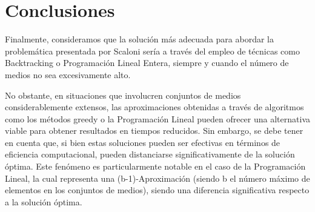 \section{Conclusiones}

Finalmente, consideramos que la solución más adecuada para abordar la problemática presentada por Scaloni sería a través del empleo de técnicas como Backtracking o Programación Lineal Entera, siempre y cuando el número de medios no sea excesivamente alto. 

No obstante, en situaciones que involucren conjuntos de medios considerablemente extensos, las aproximaciones obtenidas a través de algoritmos como los métodos greedy o la Programación Lineal pueden ofrecer una alternativa viable para obtener resultados en tiempos reducidos. Sin embargo, se debe tener en cuenta que, si bien estas soluciones pueden ser efectivas en términos de eficiencia computacional, pueden distanciarse significativamente de la solución óptima. Este fenómeno es particularmente notable en el caso de la Programación Lineal, la cual representa una (b-1)-Aproximación (siendo b el número máximo de elementos en los conjuntos de medios), siendo una diferencia significativa respecto a la solución óptima.
